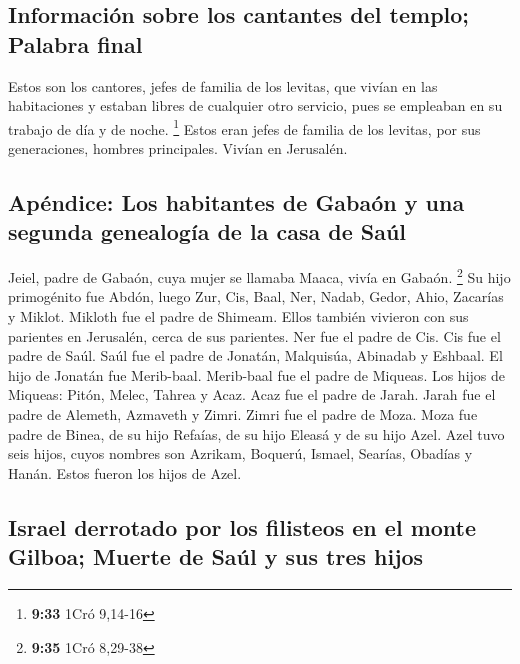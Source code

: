 \hypertarget{informaciuxf3n-sobre-los-cantantes-del-templo-palabra-final}{%
\subsection{Información sobre los cantantes del templo; Palabra
final}\label{informaciuxf3n-sobre-los-cantantes-del-templo-palabra-final}}

 Estos son los cantores, jefes de familia de los levitas,
que vivían en las habitaciones y estaban libres de cualquier otro
servicio, pues se empleaban en su trabajo de día y de noche. \footnote{\textbf{9:33}
  1Cró 9,14-16}  Estos eran jefes de familia de los
levitas, por sus generaciones, hombres principales. Vivían en Jerusalén.

\hypertarget{apuxe9ndice-los-habitantes-de-gabauxf3n-y-una-segunda-genealoguxeda-de-la-casa-de-sauxfal}{%
\subsection{Apéndice: Los habitantes de Gabaón y una segunda genealogía
de la casa de
Saúl}\label{apuxe9ndice-los-habitantes-de-gabauxf3n-y-una-segunda-genealoguxeda-de-la-casa-de-sauxfal}}

 Jeiel, padre de Gabaón, cuya mujer se llamaba Maaca,
vivía en Gabaón. \footnote{\textbf{9:35} 1Cró 8,29-38} 
Su hijo primogénito fue Abdón, luego Zur, Cis, Baal, Ner, Nadab,
 Gedor, Ahio, Zacarías y Miklot.  Mikloth
fue el padre de Shimeam. Ellos también vivieron con sus parientes en
Jerusalén, cerca de sus parientes.  Ner fue el padre de
Cis. Cis fue el padre de Saúl. Saúl fue el padre de Jonatán, Malquisúa,
Abinadab y Eshbaal.  El hijo de Jonatán fue Merib-baal.
Merib-baal fue el padre de Miqueas.  Los hijos de
Miqueas: Pitón, Melec, Tahrea y Acaz.  Acaz fue el padre
de Jarah. Jarah fue el padre de Alemeth, Azmaveth y Zimri. Zimri fue el
padre de Moza.  Moza fue padre de Binea, de su hijo
Refaías, de su hijo Eleasá y de su hijo Azel.  Azel tuvo
seis hijos, cuyos nombres son Azrikam, Boquerú, Ismael, Searías, Obadías
y Hanán. Estos fueron los hijos de Azel.

\hypertarget{israel-derrotado-por-los-filisteos-en-el-monte-gilboa-muerte-de-sauxfal-y-sus-tres-hijos}{%
\subsection{Israel derrotado por los filisteos en el monte Gilboa;
Muerte de Saúl y sus tres
hijos}\label{israel-derrotado-por-los-filisteos-en-el-monte-gilboa-muerte-de-sauxfal-y-sus-tres-hijos}}

